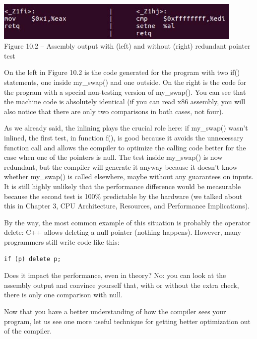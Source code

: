 \hspace*{\fill} \\ %
\begin{center}
\includegraphics[width=0.9\textwidth]{content/3/chapter10/images/2.jpg}\\
Figure 10.2 – Assembly output with (left) and without (right) redundant pointer test
\end{center}

On the left in Figure 10.2 is the code generated for the program with two if() statements, one inside my\_swap() and one outside. On the right is the code for the program with a special non-testing version of my\_swap(). You can see that the machine code is absolutely identical (if you can read x86 assembly, you will also notice that there are only two comparisons in both cases, not four). 

As we already said, the inlining plays the crucial role here: if my\_swap() wasn't inlined, the first test, in function f(), is good because it avoids the unnecessary function call and allows the compiler to optimize the calling code better for the case when one of the pointers is null. The test inside my\_swap() is now redundant, but the compiler will generate it anyway because it doesn't know whether my\_swap() is called elsewhere, maybe without any guarantees on inputs. It is still highly unlikely that the performance difference would be measurable because the second test is 100\% predictable by the hardware (we talked about this in Chapter 3, CPU Architecture, Resources, and Performance Implications).

By the way, the most common example of this situation is probably the operator delete: C++ allows deleting a null pointer (nothing happens). However, many programmers still write code like this:

\begin{lstlisting}[style=styleCXX]
if (p) delete p; 
\end{lstlisting}

Does it impact the performance, even in theory? No: you can look at the assembly output and convince yourself that, with or without the extra check, there is only one comparison with null. 

Now that you have a better understanding of how the compiler sees your program, let us see one more useful technique for getting better optimization out of the compiler.

